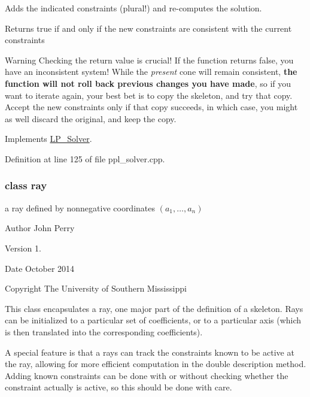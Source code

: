Adds the indicated constraints (plural!) and re-\/computes the solution. 

\begin{DoxyReturn}{Returns}
{\ttfamily true} if and only if the new constraints are consistent with the current constraints
\end{DoxyReturn}
\begin{DoxyWarning}{Warning}
Checking the return value is crucial! If the function returns {\ttfamily false}, you have an inconsistent system! While the {\itshape present} cone will remain consistent, {\bfseries the function will not roll back previous changes you have made}, so if you want to iterate again, your best bet is to copy the skeleton, and try that copy. Accept the new constraints only if that copy succeeds, in which case, you might as well discard the original, and keep the copy. 
\end{DoxyWarning}


Implements \hyperlink{group___c_l_s_solvers_a35da4bdf5db971c445f495b6eaab072d}{L\+P\+\_\+\+Solver}.



Definition at line 125 of file ppl\+\_\+solver.\+cpp.

\label{classray}
\subsubsection{class ray}
a ray defined by nonnegative coordinates $(a_1,\ldots,a_n)$ 

\begin{DoxyAuthor}{Author}
John Perry 
\end{DoxyAuthor}
\begin{DoxyVersion}{Version}
1. 
\end{DoxyVersion}
\begin{DoxyDate}{Date}
October 2014 
\end{DoxyDate}
\begin{DoxyCopyright}{Copyright}
The University of Southern Mississippi
\end{DoxyCopyright}
This class encapsulates a ray, one major part of the definition of a skeleton. Rays can be initialized to a particular set of coefficients, or to a particular axis (which is then translated into the corresponding coefficients).

A special feature is that a rays can track the constraints known to be active at the ray, allowing for more efficient computation in the double description method. Adding known constraints can be done with or without checking whether the constraint actually is active, so this should be done with care. 

